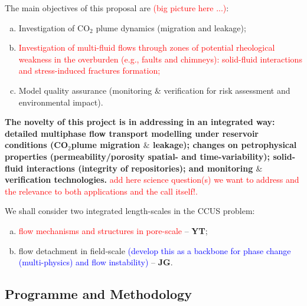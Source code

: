 \documentclass[12pts,a4paper,amsmath,amssymb,floatfix]{article}%
\newcommand{\red}{\textcolor{red}}
\newcommand{\blue}{\textcolor{blue}}
\newcommand{\CO}{CO\ensuremath{_{2}}}
\begin{document}
The main objectives of this proposal are \red{(big picture here ...)}: 
\begin{enumerate}[(a)]
%
   \item Investigation of \CO\; plume dynamics (migration and leakage);
%
   \item \red{Investigation of multi-fluid flows through zones of potential rheological weakness in the overburden (e.g., faults and chimneys): solid-fluid interactions and stress-induced fractures formation;}
%
%
   \item Model quality assurance (monitoring $\&$ verification for risk assessment and environmental impact).
%
\end{enumerate}

{\bf The novelty of this project is in addressing in an integrated way: detailed multiphase flow transport modelling under reservoir conditions (\CO plume migration $\&$ leakage); changes on petrophysical properties (permeability/porosity spatial- and time-variability); solid-fluid interactions (integrity of repositories); and monitoring $\&$ verification technologies.} \red{add here science question(s) we want to address and the relevance to both applications and the call itself!.}

\medskip
We shall consider two integrated length-scales in the CCUS problem: 
\begin{enumerate}[(a)]
  \item \red{flow mechanisms and structures in pore-scale} -- {\bf YT};
  \item flow detachment in field-scale \blue{(develop this as a backbone for phase change (multi-physics) and flow instability)} -- {\bf JG}.
\end{enumerate}


\subsection{Programme and Methodology}
\end{document}
